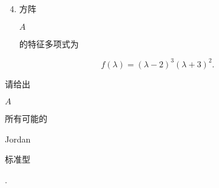 \documentclass[10pt]{article}
\begin{document}
\begin{enumerate}
  \setcounter{enumi}{3}
  \item \begin{CJK}{UTF8}{mj}方阵\end{CJK} $A$ \begin{CJK}{UTF8}{mj}的特征多项式为\end{CJK}
\end{enumerate}
$$
f(\lambda)=(\lambda-2)^{3}(\lambda+3)^{2} .
$$
\begin{CJK}{UTF8}{mj}请给出\end{CJK} $A$ \begin{CJK}{UTF8}{mj}所有可能的\end{CJK} Jordan \begin{CJK}{UTF8}{mj}标准型\end{CJK}.
\end{document}
